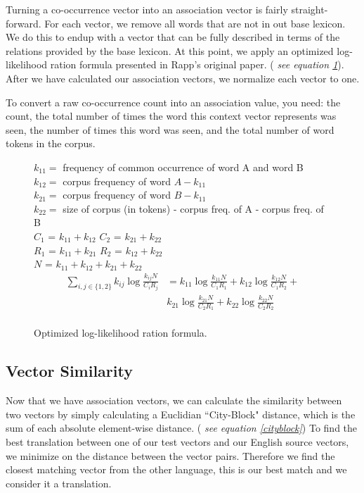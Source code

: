 \documentclass[12pt]{article}
\begin{document}
Turning a co-occurrence vector into an association vector is fairly straight-forward. For each vector, we remove all words that are not in out base lexicon. We do this to endup with a vector that can be fully described in terms of the relations provided by the base lexicon. At this point, we apply an optimized log-likelihood ration formula presented in Rapp's original paper. (\emph{ see equation \ref{loglike}}). After we have calculated our association vectors, we normalize each vector to one.

To convert a raw co-occurrence count into an association value, you need: the count, the total number of times the word this context vector represents was seen, the number of times this word was seen, and the total number of word tokens in the corpus.

\begin{figure}
$k_{11} =$ frequency of common occurrence of word A and word B \\
$k_{12} =$ corpus frequency of word $A - k_{11}$ \\
$k_{21} =$ corpus frequency of word $B - k_{11}$ \\
$k_{22} =$ size of corpus (in tokens) - corpus freq. of A - corpus freq. of B \\

$C_1$ = $k_{11} + k_{12}$
$C_2$ = $k_{21} + k_{22}$ \\
$R_1$ = $k_{11} + k_{21}$
$R_2$ = $k_{12} + k_{22}$ \\
$N$ = $k_{11} + k_{12} + k_{21} + k_{22}$ \\

  \begin{eqnarray*}
\sum_{i,j\in\{1,2\}} k_{ij}\log\frac{k_{ij}N}{C_iR_j} &= k_{11}\log\frac{k_{11}N}{C_1R_1} +  k_{12}\log\frac{k_{12}N}{C_1R_2} + \\
  & k_{21}\log\frac{k_{21}N}{C_2R_1} +  k_{22}\log\frac{k_{22}N}{C_2R_2} \\
  \end{eqnarray*}

  \caption{Optimized log-likelihood ration formula.}
  \label{loglike}
\end{figure}


\subsection{Vector Similarity}

Now that we have association vectors, we can calculate the similarity between two vectors by simply calculating a Euclidian ``City-Block" distance, which is the sum of each absolute element-wise distance. (\emph{ see equation \ref{cityblock}}) To find the best translation between one of our test vectors and our English source vectors, we minimize on the distance between the vector pairs. Therefore we find the closest matching vector from the other language, this is our best match and we consider it a translation.
\end{document}
